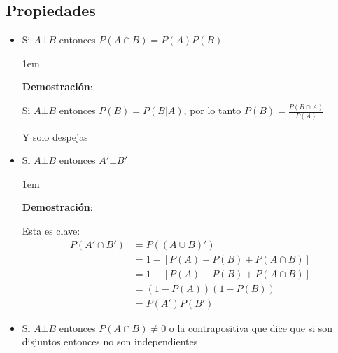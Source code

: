 \documentclass[12pt, fleqn]{report}                             %
\newenvironment{SmallIndentation}[1][0.75em]                    %
        {\begin{adjustwidth}{#1}{}\begin{footnotesize}}             %
        {\end{footnotesize}\end{adjustwidth}}                       %
\theoremstyle{break}                                            %
\begin{document}
            \subsection{Propiedades}

                \begin{itemize}
                   
                    \item
                        Si $A \bot B$ entonces $P(A \cap B) = P(A) P(B)$
                        \begin{SmallIndentation}[1em]
                            \textbf{Demostración}:
                            
                            Si $A \bot B$ entonces $P(B) = P(B | A)$, por lo tanto
                            $P(B) = \frac{P(B \cap A)}{P(A)}$

                            Y solo despejas
                        
                        \end{SmallIndentation}

                    \item
                        Si $A \bot B$ entonces $A' \bot B'$

                        \begin{SmallIndentation}[1em]
                            \textbf{Demostración}:

                            Esta es clave:
                            \begin{align*}
                                P(A' \cap B')
                                    &= P((A \cup B)')                       \\
                                    &= 1 - [P(A)  + P(B) + P(A \cap B)]     \\
                                    &= 1 - [P(A)  + P(B) + P(A \cap B)]     \\
                                    &= (1-P(A))(1-P(B))                     \\
                                    &= P(A') P(B')
                            \end{align*}
                        
                        \end{SmallIndentation}

                    \item
                        Si $A \bot B$ entonces $P(A \cap B) \neq 0$
                        o la contrapositiva que dice que si son disjuntos
                        entonces no son independientes
                            
                            
                \end{itemize}
\end{document}

